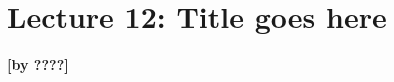 
\section{Lecture 12: Title goes here}
\begin{flushright}\textbf{[by ????]}\end{flushright}

\label{sec:lecture12}
